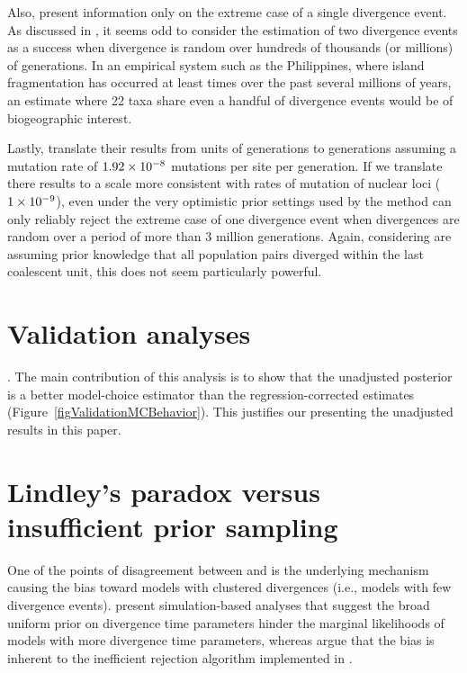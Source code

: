 \documentclass[letterpaper,12pt]{article}
\begin{document}
\begin{linenumbers}
Also, \citet{Hickerson2013} present information only on the extreme case of a
single divergence event.
As discussed in \citet{Oaks2012}, it seems odd to consider the estimation
of two divergence events as a success when divergence is random over hundreds
of thousands (or millions) of generations.
In an empirical system such as the Philippines, where island fragmentation has
occurred at least  times over the past several millions of years,
an estimate where 22 taxa share even a handful of divergence events would be of
biogeographic interest.

Lastly, \citet{Hickerson2013} translate their results from units of
\globalcoalunit generations to generations assuming a mutation rate of
$1.92\times 10^{-8}$ mutations per site per generation.
If we translate there results to a scale more consistent with rates of mutation
of nuclear loci ($1\times 10^{-9}$), even under the very optimistic prior settings used
by \citet{Hickerson2013} the method can only reliably reject the extreme case
of one divergence event when divergences are random over a period of more than
3 million generations.
Again, considering \citet{Hickerson2013} are assuming prior knowledge that
all population pairs diverged within the last coalescent unit, this
does not seem particularly powerful.



\section{Validation analyses}
.
The main contribution of this analysis is to show that the unadjusted posterior
is a better model-choice estimator than the regression-corrected estimates
(Figure~\ref{figValidationMCBehavior}).
This justifies our presenting the unadjusted results in this paper.




\section*{Lindley's paradox versus insufficient prior sampling}
One of the points of disagreement between \citet{Hickerson2013} and
\citet{Oaks2012} is the underlying mechanism causing the bias toward models
with clustered divergences (i.e., models with few divergence events).
\citet{Oaks2012} present simulation-based analyses that suggest the broad
uniform prior on divergence time parameters hinder the marginal likelihoods of
models with more divergence time parameters, whereas \citet{Hickerson2013}
argue that the bias is inherent to the inefficient rejection algorithm
implemented in \msb.


\end{linenumbers}
\end{document}
